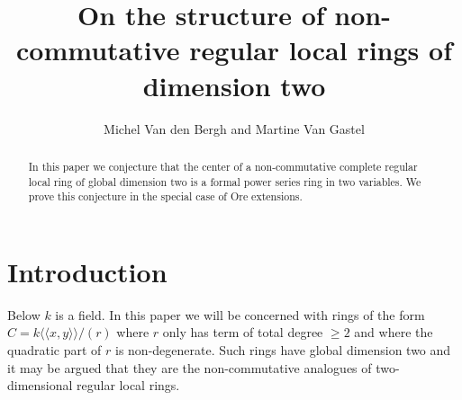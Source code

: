 \documentclass{amsart}
\author{Michel Van den Bergh and Martine Van Gastel}
\title[Non-commutative regular local rings]{On the structure of non-commutative regular local rings of
  dimension two}
\numberwithin{equation}{section}
\theoremstyle{definition}
\theoremstyle{remark}
\begin{document}
\begin{abstract}
In this paper we conjecture that the center of a non-commutative
complete regular local ring of global dimension two is a formal power
series ring in two variables. We prove this conjecture in the special
case of Ore extensions. 
\end{abstract}

\maketitle

\section{Introduction} \label{ref-1-0}

Below $k$ is a field. 
In this paper we will be concerned with  rings of the form 
$C=k\langle \langle x,y
\rangle \rangle/(r)$ where $r$ only has term of total degree $\ge
2$ and where the quadratic part of $r$ is  non-degenerate. Such rings have global dimension two \cite{VdBVG} and it may be
argued that they are the non-commutative analogues of two-dimensional
regular local rings.
\end{document}
